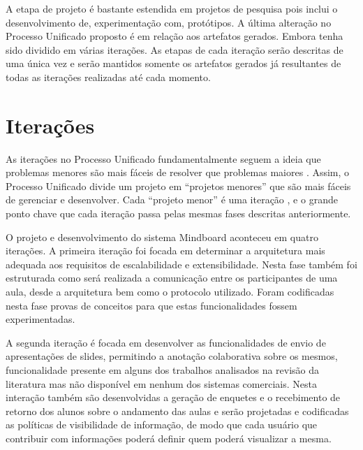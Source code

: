 A etapa de projeto é bastante estendida em projetos de pesquisa pois inclui o desenvolvimento de, experimentação com, protótipos. A última alteração no Processo Unificado proposto é em relação aos artefatos gerados. Embora tenha sido dividido em várias iterações. As etapas de cada iteração serão descritas de uma única vez e serão mantidos somente os artefatos gerados já resultantes de todas as iterações realizadas até cada momento.


\section{Iterações}

As iterações no Processo Unificado fundamentalmente seguem a ideia que problemas menores são mais fáceis de resolver que problemas maiores \cite{arlow:2002}. Assim, o Processo Unificado divide um projeto em ``projetos menores'' que são mais fáceis de gerenciar e desenvolver. Cada ``projeto menor'' é uma iteração \cite{arlow:2002}, e o grande ponto chave que cada iteração passa pelas mesmas fases descritas anteriormente.


O projeto e desenvolvimento do sistema Mindboard aconteceu em quatro iterações. A primeira iteração foi focada em determinar a arquitetura mais adequada aos requisitos de escalabilidade e extensibilidade. Nesta fase também foi estruturada como será realizada a comunicação entre os participantes de uma aula, desde a arquitetura bem como o protocolo utilizado. Foram codificadas nesta fase provas de conceitos para que estas funcionalidades fossem experimentadas.

A segunda iteração é focada em desenvolver as funcionalidades de envio de apresentações de slides, permitindo a anotação colaborativa sobre os mesmos, funcionalidade presente em alguns dos trabalhos analisados na revisão da literatura mas não disponível em nenhum dos sistemas comerciais. Nesta interação também são desenvolvidas a geração de enquetes e o recebimento de retorno dos alunos sobre o andamento das aulas e serão projetadas e codificadas as políticas de visibilidade de informação, de modo que cada usuário que contribuir com informações poderá definir quem poderá visualizar a mesma.

